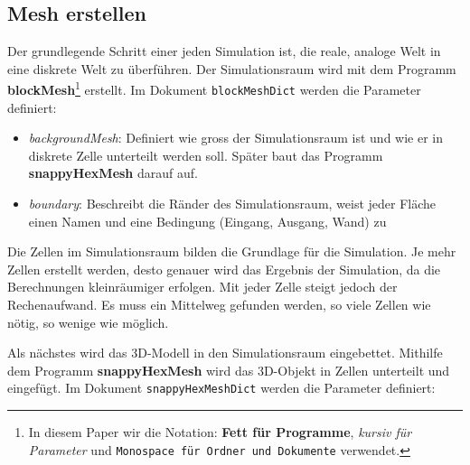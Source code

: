 \subsection{Mesh erstellen \label{openfoam:section:Mesh erstellen}}
Der grundlegende Schritt einer jeden Simulation ist, die reale, analoge Welt in eine diskrete Welt zu überführen.
Der Simulationsraum wird mit dem Programm \textbf{blockMesh}\footnote{In diesem Paper wir die Notation: \textbf{Fett für Programme}, \textit{kursiv für Parameter} und \texttt{Monospace für Ordner und Dokumente} verwendet.} 
erstellt.
Im Dokument \texttt{blockMeshDict} werden die Parameter definiert:

\begin{itemize}
    \item \textit{backgroundMesh}: Definiert wie gross der Simulationsraum ist und wie er in diskrete Zelle unterteilt werden soll. Später baut das Programm \textbf{snappyHexMesh} darauf auf.
    \item \textit{boundary}: Beschreibt die Ränder des Simulationsraum, weist jeder Fläche einen Namen und eine Bedingung (Eingang, Ausgang, Wand) zu
\end{itemize}
Die Zellen im Simulationsraum bilden die Grundlage für die Simulation. 
Je mehr Zellen erstellt werden, desto genauer wird das Ergebnis der Simulation, da die Berechnungen kleinräumiger erfolgen.
Mit jeder Zelle steigt jedoch der Rechenaufwand.
Es muss ein Mittelweg gefunden werden, so viele Zellen wie nötig, so wenige wie möglich.

Als nächstes wird das 3D-Modell in den Simulationsraum eingebettet.
Mithilfe dem Programm \textbf{snappyHexMesh} wird das 3D-Objekt in  Zellen unterteilt und eingefügt. 
Im Dokument \texttt{snappyHexMeshDict} werden die Parameter definiert:

